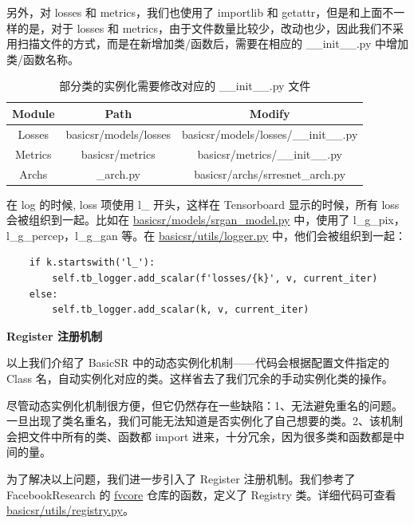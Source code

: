 \documentclass[../main.tex]{subfiles}
\begin{document}
    另外，对 losses 和 metrics，我们也使用了 importlib 和 getattr，但是和上面不一样的是，对于 losses 和 metrics，由于文件数量比较少，改动也少，因此我们不采用扫描文件的方式，而是在新增加类/函数后，需要在相应的 \_\_init\_\_.py 中增加类/函数名称。
    \begin{table}[h]
    \centering
    \begin{tabular}{|c|c|c|}
    \hline
    \textbf{Module} & \textbf{Path} & \textbf{Modify} \\ \hline
    Losses & basicsr/models/losses & basicsr/models/losses/\_\_init\_\_.py \\ \hline
    Metrics & basicsr/metrics & basicsr/metrics/\_\_init\_\_.py \\ \hline
    Archs & \_arch.py & basicsr/archs/srresnet\_arch.py \\ \hline
    \end{tabular}
    \caption{部分类的实例化需要修改对应的 \_\_init\_\_.py 文件}
    \end{table}

    在 log 的时候, loss 项使用 l\_ 开头，这样在 Tensorboard 显示的时候，所有 loss 会被组织到一起。比如在 \href{https://github.com/XPixelGroup/BasicSR/blob/master/basicsr/models/srgan_model.py}{basicsr/models/srgan\_model.py} 中，使用了 l\_g\_pix，l\_g\_percep，l\_g\_gan 等。在 \href{https://github.com/XPixelGroup/BasicSR/blob/master/basicsr/utils/logger.py}{basicsr/utils/logger.py} 中，他们会被组织到一起：
    \begin{verbatim}
    if k.startswith('l_'):
        self.tb_logger.add_scalar(f'losses/{k}', v, current_iter)
    else:
        self.tb_logger.add_scalar(k, v, current_iter)
    \end{verbatim}

    \textbf{Register 注册机制}

    以上我们介绍了 BasicSR 中的动态实例化机制——代码会根据配置文件指定的Class 名，自动实例化对应的类。这样省去了我们冗余的手动实例化类的操作。

    尽管动态实例化机制很方便，但它仍然存在一些缺陷：1、无法避免重名的问题。一旦出现了类名重名，我们可能无法知道是否实例化了自己想要的类。2、该机制会把文件中所有的类、函数都 import 进来，十分冗余，因为很多类和函数都是中间的量。

    为了解决以上问题，我们进一步引入了 Register 注册机制。我们参考了 FacebookResearch 的 \href{https://github.com/facebookresearch/fvcore}{fvcore} 仓库的函数，定义了 Registry 类。详细代码可查看 \href{https://github.com/XPixelGroup/BasicSR/blob/master/basicsr/utils/registry.py}{basicsr/utils/registry.py}。
\end{document}
